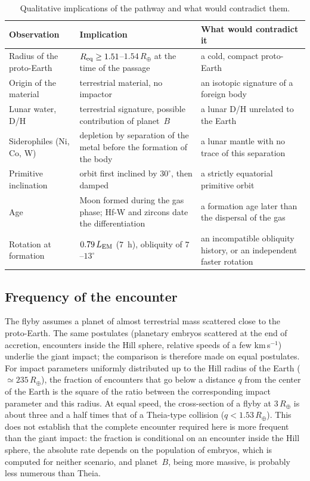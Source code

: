 \documentclass[11pt,a4paper]{article}
\newcommand{\Rt}{\ensuremath{R_\oplus}}
\newcommand{\LEM}{\ensuremath{L_{\rm EM}}}
\newcommand{\Req}{\ensuremath{R_{\rm eq}}}
\begin{document}
\begin{table}[htbp]
\centering
\caption{Qualitative implications of the pathway and what would contradict them.\label{tab:tests}}
\small
\begin{tabular}{>{\raggedright\arraybackslash}p{3.6cm}>{\raggedright\arraybackslash}p{5.6cm}>{\raggedright\arraybackslash}p{5.6cm}}
\toprule
Observation & Implication & What would contradict it \\
\midrule
Radius of the proto-Earth & $\Req\ge1.51$--$1.54\,\Rt$ at the time of the passage & a cold, compact proto-Earth \\
Origin of the material & terrestrial material, no impactor & an isotopic signature of a foreign body \\
Lunar water, D/H & terrestrial signature, possible contribution of planet~$B$ & a lunar D/H unrelated to the Earth \\
Siderophiles (Ni, Co, W) & depletion by separation of the metal before the formation of the body & a lunar mantle with no trace of this separation \\
Primitive inclination & orbit first inclined by $30^\circ$, then damped & a strictly equatorial primitive orbit \\
Age & Moon formed during the gas phase; Hf-W and zircons date the differentiation & a formation age later than the dispersal of the gas \\
Rotation at formation & $0.79\,\LEM$ ($7$~h), obliquity of $7$--$13^\circ$ & an incompatible obliquity history, or an independent faster rotation \\
\bottomrule
\end{tabular}
\end{table}

\subsection{Frequency of the encounter}

The flyby assumes a planet of almost terrestrial mass scattered close to the proto-Earth. The same postulates (planetary embryos scattered at the end of accretion, encounters inside the Hill sphere, relative speeds of a few km\,s$^{-1}$) underlie the giant impact; the comparison is therefore made on equal postulates. For impact parameters uniformly distributed up to the Hill radius of the Earth ($\simeq235\,\Rt$), the fraction of encounters that go below a distance $q$ from the center of the Earth is the square of the ratio between the corresponding impact parameter and this radius. At equal speed, the cross-section of a flyby at $3\,\Rt$ is about three and a half times that of a Theia-type collision ($q<1.53\,\Rt$). This does not establish that the complete encounter required here is more frequent than the giant impact: the fraction is conditional on an encounter inside the Hill sphere, the absolute rate depends on the population of embryos, which is computed for neither scenario, and planet~$B$, being more massive, is probably less numerous than Theia.
\end{document}
